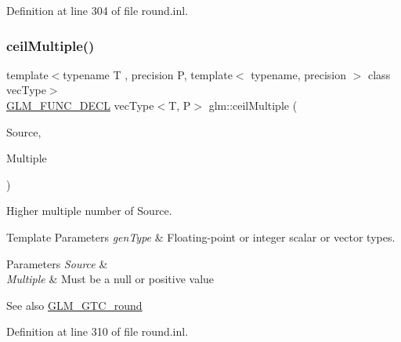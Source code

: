 Definition at line 304 of file round.\+inl.

\mbox{\label{group__gtc__round_gafe632af669ac57d670ca18e3665a12ca}} 
\subsubsection{\texorpdfstring{ceilMultiple()}{ceilMultiple()}\hspace{0.1cm}{\footnotesize\ttfamily [2/2]}}
{\footnotesize\ttfamily template$<$typename T , precision P, template$<$ typename, precision $>$ class vec\+Type$>$ \\
\mbox{\hyperlink{setup_8hpp_ab2d052de21a70539923e9bcbf6e83a51}{G\+L\+M\+\_\+\+F\+U\+N\+C\+\_\+\+D\+E\+CL}} vec\+Type$<$T, P$>$ glm\+::ceil\+Multiple (\begin{DoxyParamCaption}\item[{vec\+Type$<$ T, P $>$ const \&}]{Source,  }\item[{vec\+Type$<$ T, P $>$ const \&}]{Multiple }\end{DoxyParamCaption})}

Higher multiple number of Source.


\begin{DoxyTemplParams}{Template Parameters}
{\em gen\+Type} & Floating-\/point or integer scalar or vector types. \\
\hline
\end{DoxyTemplParams}

\begin{DoxyParams}{Parameters}
{\em Source} & \\
\hline
{\em Multiple} & Must be a null or positive value\\
\hline
\end{DoxyParams}
\begin{DoxySeeAlso}{See also}
\mbox{\hyperlink{group__gtc__round}{G\+L\+M\+\_\+\+G\+T\+C\+\_\+round}} 
\end{DoxySeeAlso}


Definition at line 310 of file round.\+inl.

\mbox{\label{group__gtc__round_gaa73c7690c787086fa3ac1c312264acab}} 
